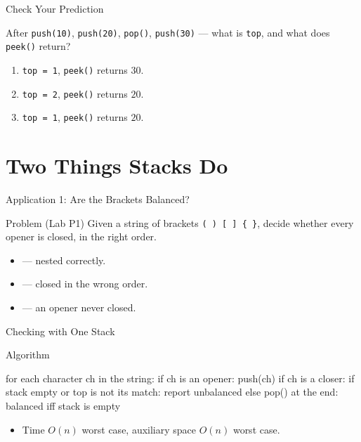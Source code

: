 \documentclass[aspectratio=169]{beamer}
\begin{document}
\begin{frame}{Check Your Prediction}
  \begin{block}{After \texttt{push(10)}, \texttt{push(20)}, \texttt{pop()},
    \texttt{push(30)} --- what is \texttt{top}, and what does \texttt{peek()}
    return?}
  \end{block}
  \begin{enumerate}
    \item \texttt{top = 1}, \texttt{peek()} returns $30$.
    \item \texttt{top = 2}, \texttt{peek()} returns $20$.
    \item \texttt{top = 1}, \texttt{peek()} returns $20$.
  \end{enumerate}
\end{frame}


\section{Two Things Stacks Do}


\begin{frame}{Application 1: Are the Brackets Balanced?}
  \begin{block}{Problem (Lab P1)}
    Given a string of brackets \texttt{( ) [ ] \{ \}}, decide whether every
    opener is closed, in the right order.
  \end{block}
  \begin{itemize}
    \item \good{\texttt{([])}} --- nested correctly.
    \item \bad{\texttt{([)]}} --- closed in the wrong order.
    \item \bad{\texttt{((()}} --- an opener never closed.
  \end{itemize}
\end{frame}

\begin{frame}[fragile]{Checking with One Stack}
  \begin{block}{Algorithm}
\begin{semiverbatim}
for each character ch in the string:
    if ch is an opener: push(ch)
    if ch is a closer:
        if stack empty or top is not its match: report unbalanced
        else pop()
at the end: balanced iff stack is empty
\end{semiverbatim}
  \end{block}
  \begin{itemize}
    \item Time $O(n)$ worst case, auxiliary space $O(n)$ worst case.
  \end{itemize}
\end{frame}
\end{document}

